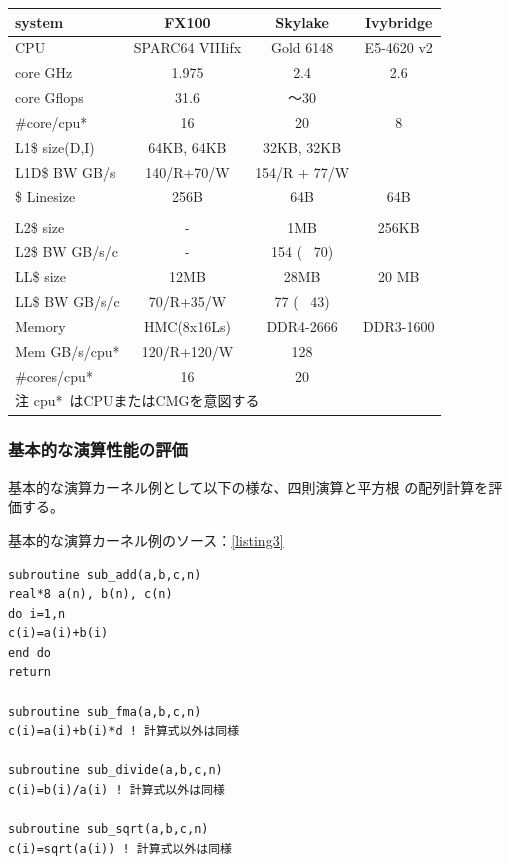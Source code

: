 \documentclass[submit,techrep,noauthor]{ipsj}
\begin{document}
\begin{table}[tb]
\ifThreeservers
\begin{tabular}{l|c|c|c} \hline
\scriptsize
system			&	FX100	&	Skylake		&	Ivybridge\\ \hline
CPU				&	SPARC64 VIIIifx	&	Gold 6148	&	E5-4620 v2	\\ \hline
core GHz		&	1.975	&	2.4	&	2.6 \\ \hline
core Gflops	&	31.6	&	〜30	\\ \hline
\#core/cpu*	&	16	&	20	&	8	\\ \hline
L1\$ size(D,I)		&	64KB, 64KB	&	32KB, 32KB	\\ \hline
L1D\$ BW GB/s	&	140/R+70/W	&	154/R + 77/W	\\ \hline
\$ Linesize 	&	256B	&	64B	&	64B	\\ \\ \hline
L2\$ size		&	-	&	1MB	&	256KB	\\ \hline
L2\$ BW GB/s/c	&	-	&	154 ( ~70)	\\ \hline
LL\$ size		&	12MB	&	28MB	&	20 MB	\\ \hline
LL\$ BW GB/s/c	&	70/R+35/W	&	77 ( ~43)	\\ \hline
Memory			&	HMC(8x16Ls)	&	DDR4-2666	& DDR3-1600	\\ \hline
Mem GB/s/cpu*	&	120/R+120/W	&	128	\\ \hline
\#cores/cpu*	&	16	&	20	\\ \hline
\multicolumn{4}{l}{\scriptsize\hspace{5mm} 注 cpu* はCPUまたはCMGを意図する}\\
\end{tabular}
\fi

\end{table}


\subsubsection{基本的な演算性能の評価}

基本的な演算カーネル例として以下の様な、四則演算と平方根
の配列計算を評価する。

基本的な演算カーネル例のソース：\lstlistingname \ref{listing3}

\begin{lstlisting}[caption={\hfill},label={listing3},captionpos=t]
subroutine sub_add(a,b,c,n)
real*8 a(n), b(n), c(n)  
do i=1,n
c(i)=a(i)+b(i)
end do
return

subroutine sub_fma(a,b,c,n)
c(i)=a(i)+b(i)*d ! 計算式以外は同様

subroutine sub_divide(a,b,c,n)
c(i)=b(i)/a(i) ! 計算式以外は同様

subroutine sub_sqrt(a,b,c,n)
c(i)=sqrt(a(i)) ! 計算式以外は同様
\end{lstlisting}
\end{document}
